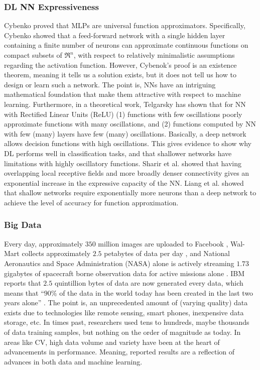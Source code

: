 \documentclass[12pt]{spieman}
\begin{document}
\begin{spacing}{1}
\subsubsection{DL NN Expressiveness}
Cybenko \cite{Cybenko1989} proved that MLPs are universal function approximators. Specifically, Cybenko showed that a feed-forward network with a single hidden layer containing a finite number of neurons can approximate continuous functions on compact subsets of $\Re^n$, with respect to relatively minimalistic assumptions regarding the activation function. However, Cybenok's proof is an existence theorem, meaning it tells us a solution exists, but it does not tell us how to design or learn such a network. The point is, NNs have an intriguing mathematical foundation that make them attractive with respect to machine learning. Furthermore, in a theoretical work, Telgarsky \cite{telgarsky2016benefits} has shown that for NN with Rectified Linear Units (ReLU) (1) functions with few oscillations poorly approximate functions with many oscillations, and (2) functions computed by NN with few (many) layers have few (many) oscillations. Basically, a deep network allows decision functions with high oscillations. This gives evidence to show why DL performs well in classification tasks, and that shallower networks have limitations with highly oscillatory functions. Sharir et al. \cite{sharir2017expressive} showed that having overlapping local receptive fields and more broadly denser connectivity gives an exponential increase in the expressive capacity of the NN. Liang et al. \cite{liang2016whydeep} showed that shallow networks require exponentially more neurons than a deep network to achieve the level of accuracy for function approximation.   

\subsubsection{Big Data}\label{subsec:bigdatareview}
Every day, approximately $350$ million images are uploaded to Facebook \cite{Brown2015Deep} , Wal-Mart collects approximately $2.5$ petabytes of data per day \cite{Brown2015Deep} , and National Aeronautics and Space Administration (NASA) alone is actively streaming $1.73$ gigabytes of spacecraft borne observation data for active missions alone \cite{Ma201547}. IBM reports that $2.5$ quintillion bytes of data are now generated every data, which means that ``$90\%$ of the data in the world today has been created in the last two years alone'' \cite{7565634} . The point is, an unprecedented amount of (varying quality) data exists due to technologies like remote sensing, smart phones, inexpensive data storage, etc. In times past, researchers used tens to hundreds, maybe thousands of data training samples, but nothing on the order of magnitude as today. In areas like CV, high data volume and variety have been at the heart of advancements in performance. Meaning, reported results are a reflection of advances in both data and machine learning.


\end{spacing}
\end{document}
